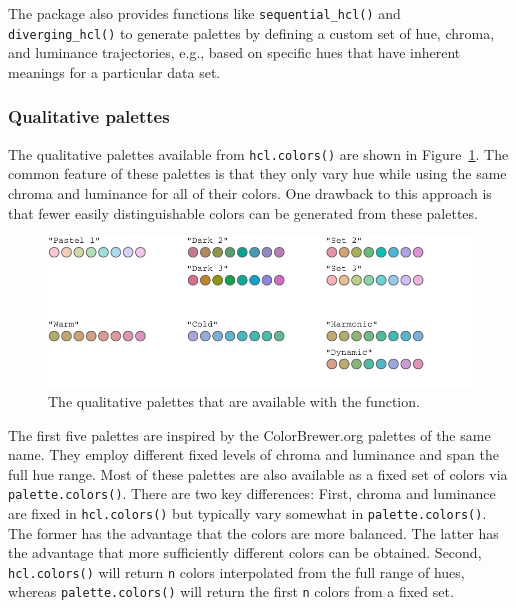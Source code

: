 The  package also provides functions like
\texttt{sequential\_hcl()} and \texttt{diverging\_hcl()}
to generate palettes by defining a custom set of
hue, chroma, and luminance
trajectories, e.g., based on specific hues that have inherent meanings
for a particular data set.

\hypertarget{qualitative-palettes}{%
\subsubsection{Qualitative palettes}\label{qualitative-palettes}}

The qualitative palettes available from \texttt{hcl.colors()} are shown
in Figure~\ref{fig:qualPalettes}.
The common feature of these palettes is that they only vary hue
while using the same chroma and luminance for all of their colors.
One drawback to this approach is that fewer easily distinguishable
colors can be generated from these palettes.

\begin{figure}[ht!]

{\centering \includegraphics[width=1\linewidth]{color_files/figure-latex/qualPalettes-1} 

}

\caption{The qualitative palettes that are available with the  function.}\label{fig:qualPalettes}
\end{figure}

The first five palettes are inspired by the ColorBrewer.org
palettes of the same name.
They employ different fixed levels of chroma and luminance and
span the full hue range.
Most of these palettes are also available as a fixed set
of colors via \texttt{palette.colors()}. There are two key differences:
First, chroma and luminance are fixed in \texttt{hcl.colors()} but typically
vary somewhat in \texttt{palette.colors()}. The former has the advantage
that the colors are more balanced. The latter has the advantage
that more sufficiently different colors can be obtained. Second,
\texttt{hcl.colors()} will return \texttt{n} colors interpolated from the full
range of hues, whereas \texttt{palette.colors()} will return the first \texttt{n}
colors from a fixed set.

